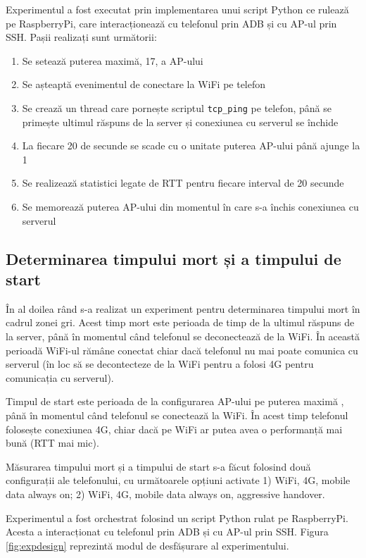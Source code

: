 Experimentul a fost executat prin implementarea unui script Python ce rulează pe RaspberryPi, care interacționează cu telefonul prin ADB și cu AP-ul prin SSH. Pașii realizați sunt următorii:
\begin{enumerate}
	\item Se setează puterea maximă, 17,  a AP-ului
	\item Se așteaptă evenimentul de conectare la WiFi pe telefon
	\item Se crează un thread care pornește scriptul \texttt{tcp\_ping} pe telefon, până se primește ultimul răspuns de la server și conexiunea cu serverul se închide
	\item La fiecare 20 de secunde se scade cu o unitate puterea AP-ului până ajunge la 1
	\item Se realizează statistici legate de RTT pentru fiecare interval de 20 secunde
	\item Se memorează puterea AP-ului din momentul în care s-a închis conexiunea cu serverul 
\end{enumerate}

\subsection{Determinarea timpului mort și a timpului de start}

În al doilea rând s-a realizat un experiment pentru determinarea timpului mort în cadrul zonei gri. Acest timp mort este perioada de timp de la ultimul răspuns de la server, până în momentul când telefonul se deconectează de la WiFi. În această perioadă WiFi-ul rămâne conectat chiar dacă telefonul nu mai poate comunica cu serverul (în loc să se decontecteze de la WiFi pentru a folosi 4G pentru comunicația cu serverul).

Timpul de start este perioada de la configurarea AP-ului pe puterea maximă , până în momentul când telefonul se conectează la WiFi. În acest timp telefonul folosește conexiunea 4G, chiar dacă pe WiFi ar putea avea o performanță mai bună (RTT mai mic).

Măsurarea timpului mort și a timpului de start s-a făcut folosind două configurații ale telefonului, cu următoarele opțiuni activate 1) WiFi, 4G, mobile data always on; 2) WiFi, 4G, mobile data always on, aggressive handover. 

Experimentul a fost orchestrat folosind un script Python rulat pe RaspberryPi. Acesta a interacționat cu telefonul prin ADB și cu AP-ul prin SSH. Figura \ref{fig:expdesign} reprezintă modul de desfășurare al experimentului. 

